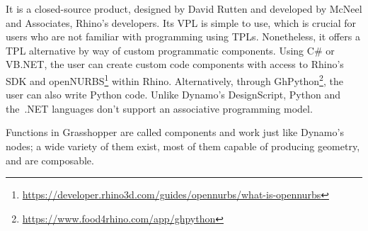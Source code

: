 It is a closed-source product, designed by David Rutten and developed by McNeel
and Associates, Rhino's developers.  Its \ac{VPL} is simple to use, which is
crucial for users who are not familiar with programming using \acp{TPL}.
Nonetheless, it offers a \ac{TPL} alternative by way of custom programmatic
components.  Using C\# or VB.NET, the user can create custom code components
with access to Rhino's \ac{SDK} and
openNURBS\footnote{\url{https://developer.rhino3d.com/guides/opennurbs/what-is-opennurbs}}
within Rhino.  Alternatively, through GhPython\footnote{\url{https://www.food4rhino.com/app/ghpython}}, the
user can also write Python code.  Unlike Dynamo's DesignScript, Python and
the~.NET languages don't support an associative programming model.

Functions in Grasshopper are called components and work just like Dynamo's
nodes; a wide variety of them exist, most of them capable of producing geometry,
and are composable.
